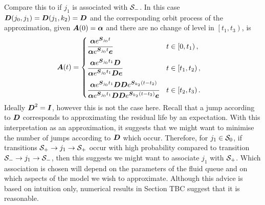 Compare this to if \({j_1}\) is associated with \(\mathcal{S}_-\). In this case \(\boldsymbol{D}({j_0},{j_1})=\boldsymbol{D}({j_1},k_2)=\boldsymbol{D}\) and the corresponding orbit process of the approximation, given \(\boldsymbol A(0) = \boldsymbol \alpha\) and there are no change of level in \(\left[t_1,t_3\right)\), is 
\begin{align*}
\boldsymbol A(t) &= \begin{cases} 
	\cfrac{\boldsymbol \alpha e^{\boldsymbol{S}_{j_0}t}}{\boldsymbol \alpha e^{\boldsymbol{S}_{{j_0}}t}\boldsymbol e} & t\in\left[0,t_1\right), \\[10pt]
	\cfrac{\boldsymbol \alpha e^{\boldsymbol{S}_{j_0}t_1}\boldsymbol{D}}{\boldsymbol \alpha e^{\boldsymbol{S}_{j_0}t_1}\boldsymbol{D}\boldsymbol e} & t\in\left[t_1,t_2\right), \\[10pt] 
	\cfrac{\boldsymbol \alpha e^{\boldsymbol{S}_{j_0}t_1}\boldsymbol{D}\boldsymbol{D}e^{\boldsymbol{S}_{k_2}(t-t_2)}}{\boldsymbol \alpha e^{\boldsymbol{S}_{j_0}t_1}\boldsymbol{D}\boldsymbol{D}e^{\boldsymbol{S}_{k_2}(t-t_2)}\boldsymbol e} & t\in\left[t_2,t_3\right).
\end{cases}
\end{align*}
Ideally \(\boldsymbol D^2=\boldsymbol I\), however this is not the case here. Recall that a jump according to \(\boldsymbol{D}\) corresponds to approximating the residual life by an expectation. With this interpretation as an approximation, it suggests that we might want to minimise the number of jumps according to \(\boldsymbol D\) which occur. Therefore, for \(j_1\in \mathcal{S}_0\), if transitions \(\mathcal{S}_+\to j_1\to \mathcal{S}_+\) occur with high probability compared to transition \(\mathcal{S}_-\to j_1\to \mathcal{S}_-\), then this suggests we might want to associate \(j_1\) with \(\mathcal{S}_+\). Which association is chosen will depend on the parameters of the fluid queue and on which aspects of the model we wish to approximate. Although this advice is based on intuition only, numerical results in Section TBC suggest that it is reasonable. %

